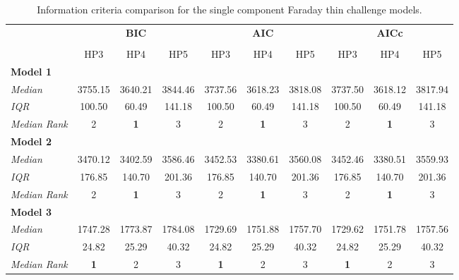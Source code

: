 \documentclass[fleqn,usenatbib]{mnras}
\begin{document}
\begin{table}
\caption{Information criteria comparison for the \protect\cite{Sun_2015} single component Faraday thin challenge models.}
    \centering
    \begin{tabular}{@{\extracolsep{3pt}}lccccccccc@{}}
    \hline
     & \multicolumn{3}{c}{\textbf{BIC}} & \multicolumn{3}{c}{\textbf{AIC}} & \multicolumn{3}{c}{\textbf{AICc}} \\
     \cline{2-4} \cline{5-7} \cline{8-10} \\
     & HP3 & HP4 & HP5 & HP3 & HP4 & HP5 & HP3 & HP4 & HP5 \\\hline
    \textbf{Model 1} & & & & & & & & & \\
    \emph{Median} & 3755.15 & 3640.21 & 3844.46 & 3737.56 & 3618.23 & 3818.08 & 3737.50 & 3618.12 & 3817.94 \\
    \emph{IQR} & 100.50 & 60.49 & 141.18 & 100.50 & 60.49 & 141.18 & 100.50 & 60.49 & 141.18 \\
    \emph{Median Rank} & 2 & \textbf{1} & 3 & 2 & \textbf{1} & 3 & 2 & \textbf{1} & 3 \\\hline
    \textbf{Model 2} & & & & & & & & & \\
    \emph{Median} & 3470.12 & 3402.59 & 3586.46 & 3452.53 & 3380.61 & 3560.08 & 3452.46 & 3380.51 & 3559.93 \\
    \emph{IQR} & 176.85 & 140.70 & 201.36 & 176.85 & 140.70 & 201.36 & 176.85 & 140.70 & 201.36 \\
    \emph{Median Rank} & 2 & \textbf{1} & 3 & 2 & \textbf{1} & 3 & 2 & \textbf{1} & 3 \\\hline
    \textbf{Model 3} & & & & & & & & & \\
    \emph{Median} & 1747.28 & 1773.87 & 1784.08 &1729.69 & 1751.88 & 1757.70 & 1729.62 & 1751.78 & 1757.56 \\
    \emph{IQR} & 24.82 & 25.29 & 40.32 & 24.82 & 25.29 & 40.32 & 24.82 & 25.29 & 40.32 \\
    \emph{Median Rank} & \textbf{1} & 2 & 3 & \textbf{1} & 2 & 3 & \textbf{1} & 2 & 3 \\\hline
    \end{tabular}
 \label{tab:icthin}
\end{table}
\end{document}
